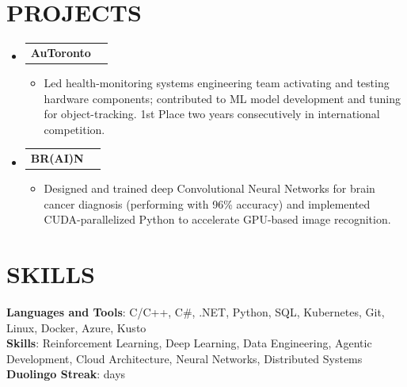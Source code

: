 \documentclass[letterpaper,11pt]{article}
\makeatletter
\newcommand{\resumeItem}[1]{
  \item\small{
    {#1 \vspace{-1pt}}
  }
}
\newcommand{\resumeProjectHeading}[2]{
    \item
    \begin{tabular*}{\textwidth}{l@{\extracolsep{\fill}}r}
      #1 & {\color{dark-grey}} \\
    \end{tabular*}\vspace{-4pt}
}
\newcommand{\resumeSubHeadingListStart}{\begin{itemize}[leftmargin=0in, label={}]}
\newcommand{\resumeSubHeadingListEnd}{\end{itemize}}
\newcommand{\resumeItemListStart}{\begin{itemize}}
\newcommand{\resumeItemListEnd}{\end{itemize}\vspace{-3pt}}
\makeatother
\begin{document}

\section{PROJECTS}
    \resumeSubHeadingListStart
      \resumeProjectHeading
          {\textbf{AuToronto}} {Sept. 2017 -- June 2019}
          \resumeItemListStart
            \resumeItem{Led health-monitoring systems engineering team activating and testing hardware components; contributed to ML model development and tuning for object-tracking. 1st Place two years consecutively in international competition.}
          \resumeItemListEnd
          
        \resumeProjectHeading
          {\textbf{BR(AI)N}}{May 2017 -- June 2019}
          \resumeItemListStart
            \resumeItem{Designed and trained deep Convolutional Neural Networks for brain cancer diagnosis (performing with 96\% accuracy) and implemented CUDA-parallelized Python to accelerate GPU-based image recognition.}
          \resumeItemListEnd
          
    \resumeSubHeadingListEnd

%
\section{SKILLS}
 \begin{itemize}[leftmargin=0in, label={}]
    \small{\item{
     \textbf{Languages and Tools}{: C/C++, C\#, .NET, Python, SQL, Kubernetes, Git, Linux, Docker, Azure, Kusto}\vspace{2pt} \\
     \textbf{Skills}{: Reinforcement Learning, Deep Learning, Data Engineering, Agentic Development, Cloud Architecture, Neural Networks, Distributed Systems}\vspace{2pt} \\
     \textbf{Duolingo Streak}{: \duolingoStreakDays{} days}\vspace{2pt} \\}}
 \end{itemize}


\end{document}
